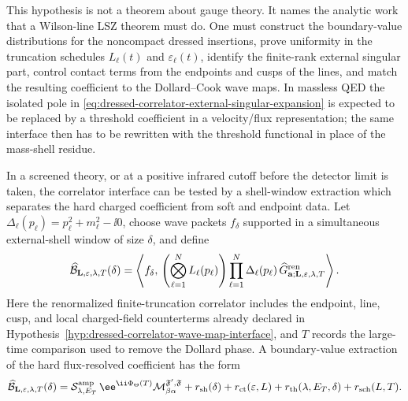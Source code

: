 This hypothesis is not a theorem about gauge theory.  It names the analytic
work that a Wilson-line LSZ theorem must do.  One must construct the
boundary-value distributions for the noncompact dressed insertions, prove
uniformity in the truncation schedules \(L_\ell(t)\) and
\(\varepsilon_\ell(t)\), identify the finite-rank external singular part,
control contact terms from the endpoints and cusps of the lines, and match
the resulting coefficient to the Dollard--Cook wave maps.  In massless QED
the isolated pole in
\eqref{eq:dressed-correlator-external-singular-expansion} is expected to be
replaced by a threshold coefficient in a velocity/flux representation; the
same interface then has to be rewritten with the threshold functional in
place of the mass-shell residue.

\begin{controlledapproximation}
\label{ca:dressed-boundary-value-hard-coefficient}
In a screened theory, or at a positive infrared cutoff before the detector
limit is taken, the correlator interface can be tested by a shell-window
extraction which separates the hard charged coefficient from soft and
endpoint data.  Let
\(\Delta_\ell(p_\ell)=p_\ell^2+m_\ell^2-\ii0\), choose wave packets
\(f_\delta\) supported in a simultaneous external-shell window of size
\(\delta\), and define
\begin{equation}
  \widehat{\mathcal B}_{\mathbf L,\varepsilon,\lambda,T}(\delta)
  =
  \left\langle
    f_\delta,\,
    \left(\bigotimes_{\ell=1}^{N}L_\ell(p_\ell)\right)
    \prod_{\ell=1}^{N}\Delta_\ell(p_\ell)\,
    \widehat G_{\mathbf a;\mathbf L,\varepsilon,\lambda,T}^{\rm ren}
  \right\rangle .
  \label{eq:dressed-boundary-value-shell-functional}
\end{equation}
Here the renormalized finite-truncation correlator includes the endpoint,
line, cusp, and local charged-field counterterms already declared in
Hypothesis~\ref{hyp:dressed-correlator-wave-map-interface}, and \(T\) records
the large-time comparison used to remove the Dollard phase.  A boundary-value
extraction of the hard flux-resolved coefficient has the form
\begin{equation}
  \widehat{\mathcal B}_{\mathbf L,\varepsilon,\lambda,T}(\delta)
  =
  \mathcal S_{\lambda,E_T}^{\rm amp}\,
  \ee^{\ii\Phi_{\Theta}(T)}
  \mathcal M_{\beta\alpha}^{\mathfrak F',\mathfrak F}
  +
  r_{\rm sh}(\delta)
  +
  r_{\rm ct}(\varepsilon,L)
  +
  r_{\rm th}(\lambda,E_T,\delta)
  +
  r_{\rm sch}(L,T).
  \label{eq:dressed-boundary-value-hard-plus-residuals}

\end{equation}
\end{controlledapproximation}
